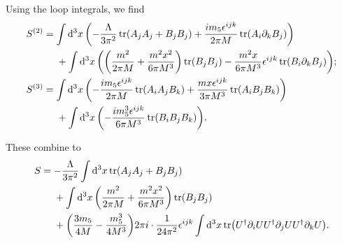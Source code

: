 \documentclass[letterpaper]{article}
\begin{document}

Using the loop integrals, we find
\begin{align*}
    S^{(2)} &= \int \dd[3]{x} \qty(-\frac{\Lambda}{3\pi^2} \tr(A_j A_j + B_j B_j) + \frac{im_5 \epsilon^{ijk}}{2\pi M} \tr(A_i \partial_k B_j)) \\
    &\phantom{{}={}} + \int \dd[3]{x} \qty(\qty(\frac{m^2}{2\pi M} + \frac{m^2 x^2}{6\pi M^3})\tr(B_j B_j) - \frac{m^2 x}{6\pi M^3}\epsilon^{ijk} \tr(B_i \partial_k B_j)); \\
    S^{(3)} &= \int \dd[3]{x} \qty(-\frac{i m_5 \epsilon^{ijk}}{2\pi M} \tr(A_i A_j B_k) + \frac{m x \epsilon^{ijk}}{3\pi M^3}\tr(A_i B_j B_k)) \\
    &\phantom{{}={}} + \int \dd[3]{x} \qty(-\frac{i m_5^3 \epsilon^{ijk}}{6\pi M^3}\tr(B_i B_j B_k)).
\end{align*}

These combine to
\begin{align*}
    S &= -\frac{\Lambda}{3\pi^2} \int \dd[3]{x} \tr(A_j A_j + B_j B_j) \\
        &\phantom{{}={}} + \int \dd[3]{x} \qty(\frac{m^2}{2\pi M} + \frac{m^2 x^2}{6\pi M^3})\tr(B_j B_j) \\
        &\phantom{{}={}} + \qty(\frac{3m_5}{4M} - \frac{m_5^3}{4M^3}) 2\pi i \cdot  \frac{1}{24\pi^2} \epsilon^{ijk}  \int \dd[3]{x} \tr(U^\dagger \partial_i U U^\dagger \partial_j U U^\dagger \partial_k U). %
\end{align*}

% 
% 
\end{document}
